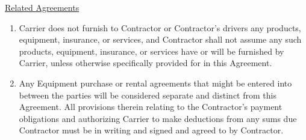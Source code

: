 \underline{Related Agreements}
\begin{enumerate}[
    ref = \SecondLevelEnumerator
]
    \item Carrier does not furnish to Contractor or Contractor's drivers
    any products, equipment, insurance, or services, and Contractor shall
    not assume any such products, equipment, insurance, or services have or
    will be furnished by Carrier, unless otherwise specifically provided
    for in this Agreement.

    \item Any Equipment purchase or rental agreements that might be entered
    into between the parties will be considered separate and distinct from
    this Agreement. All provisions therein relating to the Contractor's
    payment obligations and authorizing Carrier to make deductions from any
    sums due Contractor must be in writing and signed and agreed to by
    Contractor.
\end{enumerate}
